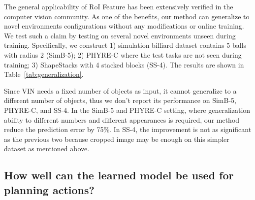 \documentclass{article} \usepackage{iclr2021_conference,times}
\begin{document}
The general applicability of RoI Feature has been extensively verified in the computer vision community. As one of the benefits, our method can generalize to novel environments configurations without any modifications or online training. We test such a claim by testing on several novel environments unseen during training. Specifically, we construct 1) simulation billiard dataset contains 5 balls with radius 2 (SimB-5); 2) PHYRE-C where the test tasks are not seen during training; 3) ShapeStacks with 4 stacked blocks (SS-4). The results are shown in Table~\ref{tab:generalization}.

Since VIN needs a fixed number of objects as input, it cannot generalize to a different number of objects, thus we don't report its performance on SimB-5, PHYRE-C, and SS-4. In the SimB-5 and PHYRE-C setting, where generalization ability to different numbers and different appearances is required, our method reduce the prediction error by 75\%. In SS-4, the improvement is not as significant as the previous two because cropped image may be enough on this simpler dataset as mentioned above.

\vspace{-0.5em}
\subsection{How well can the learned model be used for planning actions?}\label{sec:plan}
\vspace{-0.5em}
\end{document}
